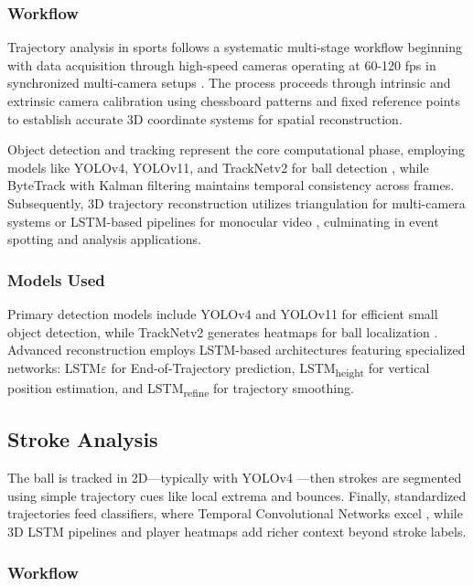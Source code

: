 \documentclass[conference]{IEEEtran}
\begin{document}
\subsubsection{Workflow}

Trajectory analysis in sports follows a systematic multi-stage workflow beginning with data acquisition through high-speed cameras operating at 60-120 fps in synchronized multi-camera setups \cite{electronics14010027}. The process proceeds through intrinsic and extrinsic camera calibration using chessboard patterns and fixed reference points to establish accurate 3D coordinate systems for spatial reconstruction.

Object detection and tracking represent the core computational phase, employing models like YOLOv4, YOLOv11, and TrackNetv2 for ball detection \cite{electronics14010027}, while ByteTrack with Kalman filtering maintains temporal consistency across frames. Subsequently, 3D trajectory reconstruction utilizes triangulation for multi-camera systems or LSTM-based pipelines for monocular video \cite{pongball}, culminating in event spotting and analysis applications.

\subsubsection{Models Used}

Primary detection models include YOLOv4 and YOLOv11 for efficient small object detection, while TrackNetv2 generates heatmaps for ball localization \cite{electronics14010027}. Advanced reconstruction employs LSTM-based architectures featuring specialized networks: LSTM$\varepsilon$ for End-of-Trajectory prediction, LSTM\textsubscript{height} for vertical position estimation, and LSTM\textsubscript{refine} for trajectory smoothing.

\subsection{Stroke Analysis}

The ball is tracked in 2D---typically with YOLOv4 \cite{strokeandball}---then strokes are segmented using simple trajectory cues like local extrema and bounces. Finally, standardized trajectories feed classifiers, where Temporal Convolutional Networks excel \cite{strokeandball}, while 3D LSTM pipelines and player heatmaps add richer context beyond stroke labels.

\subsubsection{Workflow}
\end{document}
